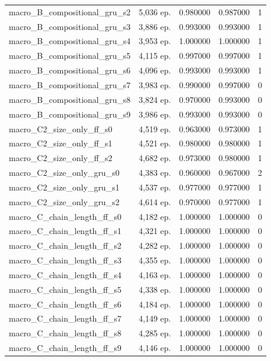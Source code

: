 \begin{tabular}{llrrr}
macro\_B\_compositional\_gru\_s2 & 5,036 ep. & 0.980000 & 0.987000 & 1 \\
macro\_B\_compositional\_gru\_s3 & 3,886 ep. & 0.993000 & 0.993000 & 1 \\
macro\_B\_compositional\_gru\_s4 & 3,953 ep. & 1.000000 & 1.000000 & 1 \\
macro\_B\_compositional\_gru\_s5 & 4,115 ep. & 0.997000 & 0.997000 & 1 \\
macro\_B\_compositional\_gru\_s6 & 4,096 ep. & 0.993000 & 0.993000 & 1 \\
macro\_B\_compositional\_gru\_s7 & 3,983 ep. & 0.990000 & 0.997000 & 0 \\
macro\_B\_compositional\_gru\_s8 & 3,824 ep. & 0.970000 & 0.993000 & 0 \\
macro\_B\_compositional\_gru\_s9 & 3,986 ep. & 0.993000 & 0.993000 & 0 \\
macro\_C2\_size\_only\_ff\_s0 & 4,519 ep. & 0.963000 & 0.973000 & 1 \\
macro\_C2\_size\_only\_ff\_s1 & 4,521 ep. & 0.980000 & 0.980000 & 1 \\
macro\_C2\_size\_only\_ff\_s2 & 4,682 ep. & 0.973000 & 0.980000 & 1 \\
macro\_C2\_size\_only\_gru\_s0 & 4,383 ep. & 0.960000 & 0.967000 & 2 \\
macro\_C2\_size\_only\_gru\_s1 & 4,537 ep. & 0.977000 & 0.977000 & 1 \\
macro\_C2\_size\_only\_gru\_s2 & 4,614 ep. & 0.970000 & 0.977000 & 1 \\
macro\_C\_chain\_length\_ff\_s0 & 4,182 ep. & 1.000000 & 1.000000 & 0 \\
macro\_C\_chain\_length\_ff\_s1 & 4,321 ep. & 1.000000 & 1.000000 & 0 \\
macro\_C\_chain\_length\_ff\_s2 & 4,282 ep. & 1.000000 & 1.000000 & 0 \\
macro\_C\_chain\_length\_ff\_s3 & 4,355 ep. & 1.000000 & 1.000000 & 0 \\
macro\_C\_chain\_length\_ff\_s4 & 4,163 ep. & 1.000000 & 1.000000 & 0 \\
macro\_C\_chain\_length\_ff\_s5 & 4,338 ep. & 1.000000 & 1.000000 & 0 \\
macro\_C\_chain\_length\_ff\_s6 & 4,184 ep. & 1.000000 & 1.000000 & 0 \\
macro\_C\_chain\_length\_ff\_s7 & 4,149 ep. & 1.000000 & 1.000000 & 0 \\
macro\_C\_chain\_length\_ff\_s8 & 4,285 ep. & 1.000000 & 1.000000 & 0 \\
macro\_C\_chain\_length\_ff\_s9 & 4,146 ep. & 1.000000 & 1.000000 & 0 \\

\end{tabular}
